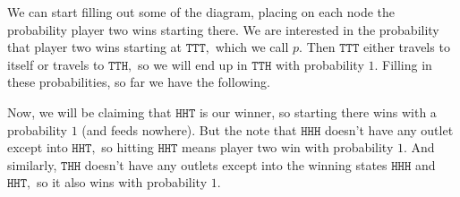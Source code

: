 We can start filling out some of the diagram, placing on each node the probability player two wins starting there. We are interested in the probability that player two wins starting at $\texttt{TTT},$ which we call $p.$ Then $\texttt{TTT}$ either travels to itself or travels to $\texttt{TTH},$ so we will end up in $\texttt{TTH}$ with probability $1.$ Filling in these probabilities, so far we have the following.
\begin{center}
\end{center}
Now, we will be claiming that $\texttt{HHT}$ is our winner, so starting there wins with a probability $1$ (and feeds nowhere). But the note that $\texttt{HHH}$ doesn't have any outlet except into $\texttt{HHT},$ so hitting $\texttt{HHT}$ means player two win with probability $1.$ And similarly, $\texttt{THH}$ doesn't have any outlets except into the winning states $\texttt{HHH}$ and $\texttt{HHT},$ so it also wins with probability $1.$
\begin{center}
\end{center}
